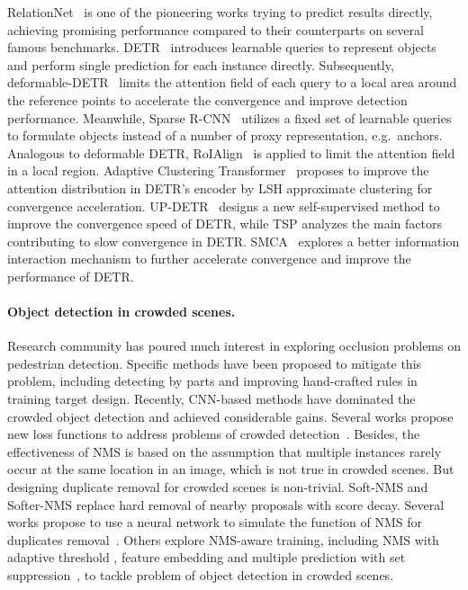 \documentclass[final]{cvpr}
\begin{document}
RelationNet~\cite{hu2018relation} is one of the pioneering works trying to predict results directly, achieving promising performance compared to their counterparts on several famous benchmarks. DETR~\cite{carion2020end}  introduces learnable queries to represent objects and perform single prediction for each instance directly. Subsequently, deformable-DETR~\cite{zhu2021deformable}  limits the attention field of each query to a local area around the reference points to accelerate the convergence and improve detection performance. Meanwhile, Sparse R-CNN~\cite{sun2020sparse}  utilizes a fixed set of learnable queries to formulate objects instead of a number of proxy representation, e.g.\ anchors. Analogous to deformable DETR, RoIAlign~\cite{he2017mask} is applied to limit the attention field in a local region. Adaptive Clustering Transformer~\cite{act2021} proposes to improve the attention distribution in DETR’s encoder by LSH approximate clustering for convergence acceleration. UP-DETR~\cite{up2021detr} designs a new self-supervised method to improve the convergence speed of DETR, while TSP\cite{sun2020tsp} analyzes the main factors contributing to slow convergence in DETR. SMCA~\cite{fastCdetr} explores a better information interaction mechanism to further accelerate convergence and improve the performance of DETR.

\vspace{-0.5cm}
\paragraph{Object detection in crowded scenes.}

Research community has poured much interest in exploring occlusion problems on pedestrian detection. Specific methods have been proposed to mitigate this problem, including detecting by parts \cite{lu2019semantic, chi2020pedhunter, chi2020relational, zhang2019double,zhang2018occlusion} and improving hand-crafted rules in training target design. Recently, CNN-based methods have dominated the crowded object detection and achieved considerable gains. Several works propose new loss functions to address problems of crowded detection~\cite{wang2017repulsion,zhang2018occlusion}. Besides, the effectiveness of NMS is based on the assumption that multiple instances rarely occur at the same location in an image, which is not true in crowded scenes. But designing duplicate removal for crowded scenes is non-trivial. Soft-NMS \cite{bodla2017soft} and Softer-NMS \cite{he2018softer} replace hard removal of nearby proposals with score decay. Several works propose to use a neural network to simulate the function of NMS for duplicates removal~\cite{gossipnet, qi2018sequential}. Others explore NMS-aware training, including NMS with adaptive threshold \cite{hosang2016a,liu2019adaptive}, feature embedding \cite{salscheider2021featurenms} and multiple prediction with set suppression~\cite{chu2020detection, huang2020nms}, to tackle problem of object detection in crowded scenes.
\end{document}
